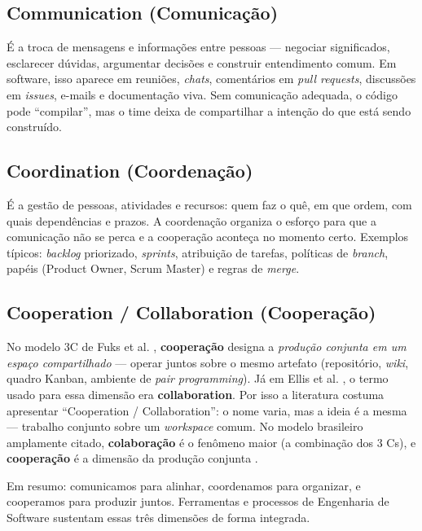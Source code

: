 \documentclass[
    12pt,
    oneside,
    a4paper,
    article,
    section=TITLE,
    sumario=abnt-6027-2012
]{abntex2}
\begin{document}
\subsection{Communication (Comunicação)}

É a troca de mensagens e informações entre pessoas --- negociar significados, esclarecer dúvidas, argumentar decisões e construir entendimento comum. Em software, isso aparece em reuniões, \textit{chats}, comentários em \textit{pull requests}, discussões em \textit{issues}, e-mails e documentação viva. Sem comunicação adequada, o código pode ``compilar'', mas o time deixa de compartilhar a intenção do que está sendo construído.

\subsection{Coordination (Coordenação)}

É a gestão de pessoas, atividades e recursos: quem faz o quê, em que ordem, com quais dependências e prazos. A coordenação organiza o esforço para que a comunicação não se perca e a cooperação aconteça no momento certo. Exemplos típicos: \textit{backlog} priorizado, \textit{sprints}, atribuição de tarefas, políticas de \textit{branch}, papéis (Product Owner, Scrum Master) e regras de \textit{merge}.

\subsection{Cooperation / Collaboration (Cooperação)}

No modelo 3C de Fuks et al. \cite{fuks2008}, \textbf{cooperação} designa a \textit{produção conjunta em um espaço compartilhado} --- operar juntos sobre o mesmo artefato (repositório, \textit{wiki}, quadro Kanban, ambiente de \textit{pair programming}). Já em Ellis et al. \cite{ellis1991}, o termo usado para essa dimensão era \textbf{collaboration}. Por isso a literatura costuma apresentar ``Cooperation / Collaboration'': o nome varia, mas a ideia é a mesma --- trabalho conjunto sobre um \textit{workspace} comum. No modelo brasileiro amplamente citado, \textbf{colaboração} é o fenômeno maior (a combinação dos 3 Cs), e \textbf{cooperação} é a dimensão da produção conjunta \cite{gerosa2004}.

Em resumo: comunicamos para alinhar, coordenamos para organizar, e cooperamos para produzir juntos. Ferramentas e processos de Engenharia de Software sustentam essas três dimensões de forma integrada.
\end{document}

